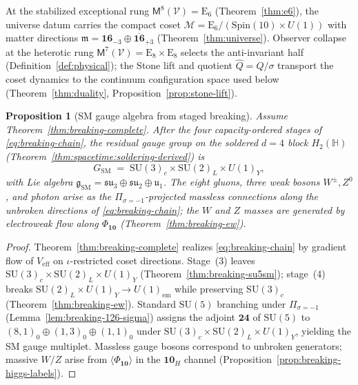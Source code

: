 \documentclass[11pt]{article}
\theoremstyle{plain}
\newtheorem{proposition}[theorem]{Proposition}
\theoremstyle{definition}
\theoremstyle{remark}
\numberwithin{equation}{section}
\newcommand{\Quat}{\mathbb{H}}
\newcommand{\E}[1]{\mathrm{E}_{#1}}
\newcommand{\Spin}{\mathrm{Spin}}
\newcommand{\Void}{\mathcal{V}}
\newcommand{\Mirror}{\mathsf{M}}
\begin{document}
At the stabilized exceptional rung $\Mirror^8(\Void)=\E{6}$
(Theorem~\ref{thm:e6}), the universe datum carries the compact coset
$\mathcal{M}=\E{6}/(\Spin(10)\times U(1))$ with matter directions
$\mathfrak{m}=\mathbf{16}_{-3}\oplus\overline{\mathbf{16}}_{+3}$
(Theorem~\ref{thm:universe}). Observer collapse at the heterotic rung
$\Mirror^7(\Void)=\E{8}\times\E{8}$ selects the anti-invariant half
(Definition~\ref{def:physical}); the Stone lift and quotient
$\hat Q=Q/\sigma$ transport the coset dynamics to the continuum
configuration space used below (Theorem~\ref{thm:duality},
Proposition~\ref{prop:stone-lift}).

\begin{proposition}[SM gauge algebra from staged breaking]
\label{prop:sm-gauge-content}
Assume Theorem~\ref{thm:breaking-complete}. After the four capacity-ordered
stages of \eqref{eq:breaking-chain}, the residual gauge group on the
soldered $d=4$ block $H_2(\Quat)$ (Theorem~\ref{thm:spacetime:soldering-derived})
is
\begin{equation}\label{eq:sm-gauge-group}
  G_{\mathrm{SM}}
  \;=\;
  \mathrm{SU}(3)_c\times\mathrm{SU}(2)_L\times U(1)_Y,
\end{equation}
with Lie algebra $\mathfrak{g}_{\mathrm{SM}}=\mathfrak{su}_3\oplus\mathfrak{su}_2
\oplus\mathfrak{u}_1$. The eight gluons, three weak bosons
$W^\pm,Z^0$, and photon arise as the $\Pi_{\sigma=-1}$-projected massless
connections along the unbroken directions of \eqref{eq:breaking-chain}; the
$W$ and $Z$ masses are generated by electroweak flow along $\Phi_{\mathbf{10}}$
(Theorem~\ref{thm:breaking-ew}).
\end{proposition}

\begin{proof}
Theorem~\ref{thm:breaking-complete} realizes
\eqref{eq:breaking-chain} by gradient flow of $V_{\mathrm{eff}}$ on
$\iota$-restricted coset directions. Stage~(3) leaves
$\mathrm{SU}(3)_c\times\mathrm{SU}(2)_L\times U(1)_Y$
(Theorem~\ref{thm:breaking-su5sm}); stage~(4) breaks
$\mathrm{SU}(2)_L\times U(1)_Y\to U(1)_{\mathrm{em}}$ while preserving
$\mathrm{SU}(3)_c$ (Theorem~\ref{thm:breaking-ew}). Standard $\mathrm{SU}(5)$
branching under $\Pi_{\sigma=-1}$ (Lemma~\ref{lem:breaking-126-sigma})
assigns the adjoint $\mathbf{24}$ of $\mathrm{SU}(5)$ to
$(8,1)_0\oplus(1,3)_0\oplus(1,1)_0$ under
$\mathrm{SU}(3)_c\times\mathrm{SU}(2)_L\times U(1)_Y$, yielding the SM gauge
multiplet. Massless gauge bosons correspond to unbroken generators; massive
$W/Z$ arise from $\langle\Phi_{\mathbf{10}}\rangle$ in the $\mathbf{10}_H$
channel (Proposition~\ref{prop:breaking-higgs-labels}).
\end{proof}
\end{document}

